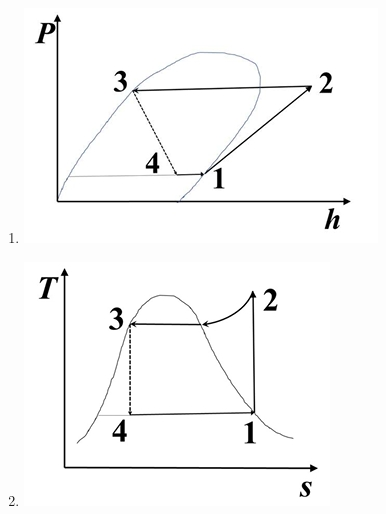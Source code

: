 \documentclass[journal]{IEEEtran}
\theoremstyle{remark}
\begin{document}
\begin{enumerate}[itemsep=1em]
\begin{multicols}{4}
\begin{enumerate}
\begin{minipage}[t]{0.2\textwidth}
        \label{fig-12}
    \end{minipage}
    \item \begin{minipage}[t]{0.2\textwidth}
    \vspace{0pt}
        \includegraphics[width=\columnwidth]{figs/fig-10.jpeg}
        \label{fig-13}
    \end{minipage}
    \item \begin{minipage}[t]{0.2\textwidth}
    \vspace{0pt}
        \includegraphics[width=\columnwidth]{figs/fig-11.jpeg}
    \label{fig-14}
    \end{minipage}
\end{enumerate}
\end{multicols}
\end{enumerate}
\end{document}

